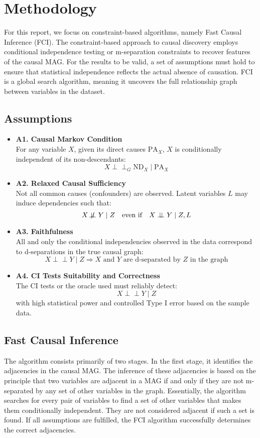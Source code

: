 \documentclass[main.tex]{subfiles}
\begin{document}
\section{Methodology}
For this report, we focus on constraint-based algorithms, namely Fast Causal Inference (FCI). The constraint-based approach to causal discovery employs conditional independence testing or m-separation constraints to recover features of the causal MAG. For the results to be valid, a set of assumptions must hold to ensure that statistical independence reflects the actual absence of causation. FCI is a global search algorithm, meaning it uncovers the full relationship graph between variables in the dataset.
\subsection{Assumptions}
\begin{itemize}
    \item \textbf{A1. Causal Markov Condition} \\
    For any variable \( X \), given its direct causes \( \text{PA}_X \), \( X \) is conditionally independent of its non-descendants:
    \[
    X \perp\!\!\!\perp_{G} \text{ND}_X \mid \text{PA}_X
    \]

    \item \textbf{A2. Relaxed Causal Sufficiency} \\
    Not all common causes (confounders) are observed. Latent variables \( L \) may induce dependencies such that:
    \[
    X \not\!\perp\!\!\!\perp Y \mid Z \quad \text{even if} \quad X \perp\!\!\!\perp Y \mid Z, L
    \]

    \item \textbf{A3. Faithfulness} \\
    All and only the conditional independencies observed in the data correspond to d-separations in the true causal graph:
    \[
    X \perp\!\!\!\perp Y \mid Z \Rightarrow X \text{ and } Y \text{ are d-separated by } Z \text{ in the graph}
    \]

    \item \textbf{A4. CI Tests Suitability and Correctness} \\
    The CI tests or the oracle used must reliably detect:
    \[
    X \perp\!\!\!\perp Y \mid Z
    \]
    with high statistical power and controlled Type I error based on the sample data.
\end{itemize}


\subsection{Fast Causal Inference}
The algorithm consists primarily of two stages. In the first stage, it identifies the adjacencies in the causal MAG. The inference of these adjacencies is based on the principle that two variables are adjacent in a MAG if and only if they are not m-separated by any set of other variables in the graph. Essentially, the algorithm searches for every pair of variables to find a set of other variables that makes them conditionally independent. They are not considered adjacent if such a set is found. If all assumptions are fulfilled, the FCI algorithm successfully determines the correct adjacencies.
\end{document}
